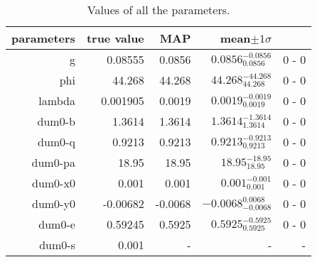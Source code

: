 \begin{table*}\caption{Values of all the parameters.}\begin{center}\begin{tabular}{ r r r r r} parameters & true value & MAP & mean$\pm 1 \sigma$ \\ 
\hline  g & 0.08555 & 0.0856 & $0.0856_{0.0856}^{-0.0856}$ & 0 - 0 \\ 
 phi & 44.268 & 44.268 & $44.268_{44.268}^{-44.268}$ & 0 - 0 \\ 
\hline lambda & 0.001905 & 0.0019 & $0.0019_{0.0019}^{-0.0019}$ & 0 - 0 \\ 
\hline dum0-b & 1.3614 & 1.3614 & $1.3614_{1.3614}^{-1.3614}$ & 0 - 0 \\ 
 dum0-q & 0.9213 & 0.9213 & $0.9213_{0.9213}^{-0.9213}$ & 0 - 0 \\ 
 dum0-pa & 18.95 & 18.95 & $18.95_{18.95}^{-18.95}$ & 0 - 0 \\ 
 dum0-x0 & 0.001 & 0.001 & $0.001_{0.001}^{-0.001}$ & 0 - 0 \\ 
 dum0-y0 & -0.00682 & -0.0068 & $-0.0068_{-0.0068}^{0.0068}$ & 0 - 0 \\ 
 dum0-e & 0.59245 & 0.5925 & $0.5925_{0.5925}^{-0.5925}$ & 0 - 0 \\ 
 dum0-s & 0.001 & - & - & - \\ 
\hline\end{tabular}\end{center}\label{tab:1}\end{table*}